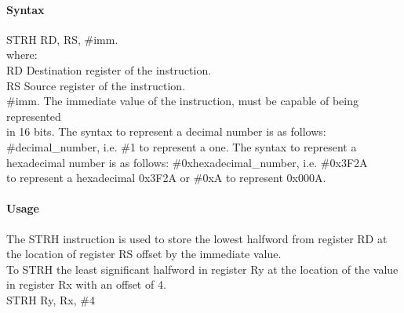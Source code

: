 \documentclass[12pt]{article}
\begin{document}
    \paragraph{Syntax}
    \begin{flushleft}
    STRH RD, RS, \#imm.\\
    \vspace{1em}        %
    where:\\
    \vspace{1em}
    RD  \hspace{3.6em} Destination register of the instruction.\\
    \vspace{1em}
    RS  \hspace{3.85em} Source register of the instruction.\\
    \vspace{1em}
    \#imm.  \hspace{1.8em} The immediate value of the instruction, must be capable of being represented\\             \hspace{5.4em} in 16 bits. The syntax to represent a decimal number is as follows:\\
            \hspace{5.4em} \#decimal\_number, i.e. \#1 to represent a one. The syntax to represent a\\
            \hspace{5.4em} hexadecimal number is as follows: \#0xhexadecimal\_number, i.e. \#0x3F2A \\
            \hspace{5.4em} to represent a hexadecimal 0x3F2A or \#0xA to represent 0x000A.\\
    \end{flushleft}
    
    \paragraph{Usage}
    \begin{flushleft}
    The STRH instruction is used to store the lowest halfword from register RD at the location of register RS offset by the immediate value.\\    
    \vspace{1em}
    To STRH the least significant halfword in register Ry at the location of the value in register Rx with an offset of 4.\\
    \vspace{1em}
    STRH Ry, Rx, \#4
    \end{flushleft}
    
\end{document}
